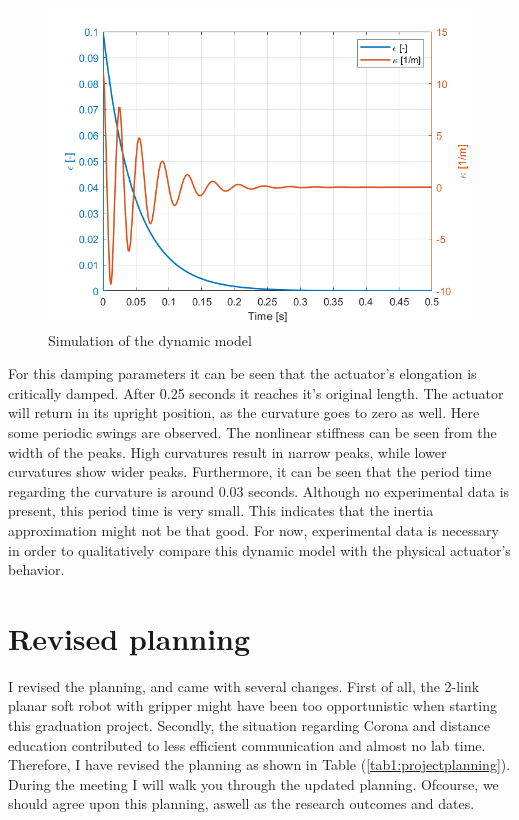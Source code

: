 \begin{figure}[H]
    \centering
    \includegraphics[width = \textwidth]{Figures/ProgresFigures/sim.png}
    \caption{Simulation of the dynamic model}
    \label{fig:sim}
\end{figure}

For this damping parameters it can be seen that the actuator's elongation is critically damped. After 0.25 seconds it reaches it's original length. The actuator will return in its upright position, as the curvature goes to zero as well. Here some periodic swings are observed. The nonlinear stiffness can be seen from the width of the peaks. High curvatures result in narrow peaks, while lower curvatures show wider peaks. Furthermore, it can be seen that the period time regarding the curvature is around 0.03 seconds. Although no experimental data is present, this period time is very small. This indicates that the inertia approximation might not be that good. For now, experimental data is necessary in order to qualitatively compare this dynamic model with the physical actuator's behavior.

\newpage

\section{Revised planning}

I revised the planning, and came with several changes. First of all, the 2-link planar soft robot with gripper might have been too opportunistic when starting this graduation project. Secondly, the situation regarding Corona and distance education contributed to less efficient communication and almost no lab time. Therefore, I have revised the planning as shown in Table (\ref{tab1:projectplanning}). During the meeting I will walk you through the updated planning. Ofcourse, we should agree upon this planning, aswell as the research outcomes and dates. 




